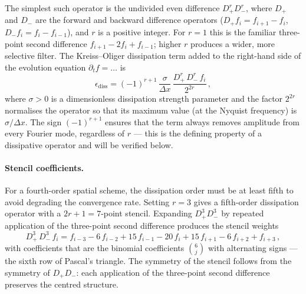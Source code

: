 The simplest such operator is the undivided even difference
$D_+^r D_-^r$, where $D_+$ and $D_-$ are the forward and backward
difference operators ($D_+ f_i = f_{i+1} - f_i$,
$D_- f_i = f_i - f_{i-1}$), and $r$ is a positive integer.  For $r = 1$
this is the familiar three-point second difference
$f_{i+1} - 2f_i + f_{i-1}$; higher $r$ produces a wider, more selective
filter.  The Kreiss--Oliger dissipation term added to the right-hand side
of the evolution equation $\partial_t f = \ldots$ is
%
\begin{equation}
  \epsilon_{\text{diss}}
  = (-1)^{r+1}\,\frac{\sigma}{\Delta x}\,
    \frac{D_+^r\,D_-^r\,f_i}{2^{2r}} \,,
  \label{eq:ko-operator}
\end{equation}
%
where $\sigma > 0$ is a dimensionless dissipation strength parameter and
the factor $2^{2r}$ normalises the operator so that its maximum value
(at the Nyquist frequency) is $\sigma/\Delta x$.  The sign
$(-1)^{r+1}$ ensures that the term always removes amplitude from
every Fourier mode, regardless of $r$ --- this is the defining property
of a dissipative operator and will be verified below.

\paragraph{Stencil coefficients.}

For a fourth-order spatial scheme, the dissipation order must be at least
fifth to avoid degrading the convergence rate.  Setting $r = 3$ gives a
fifth-order dissipation operator with a $2r + 1 = 7$-point stencil.
Expanding $D_+^3 D_-^3$ by repeated application of the three-point
second difference produces the stencil weights
%
\begin{equation}
  D_+^3\,D_-^3\,f_i = f_{i-3} - 6\,f_{i-2} + 15\,f_{i-1} - 20\,f_i
    + 15\,f_{i+1} - 6\,f_{i+2} + f_{i+3} \,,
  \label{eq:ko-stencil}
\end{equation}
%
with coefficients that are the binomial coefficients $\binom{6}{j}$
with alternating signs --- the sixth row of Pascal's triangle.  The
symmetry of the stencil follows from the symmetry of $D_+ D_-$: each
application of the three-point second difference preserves the centred
structure.

